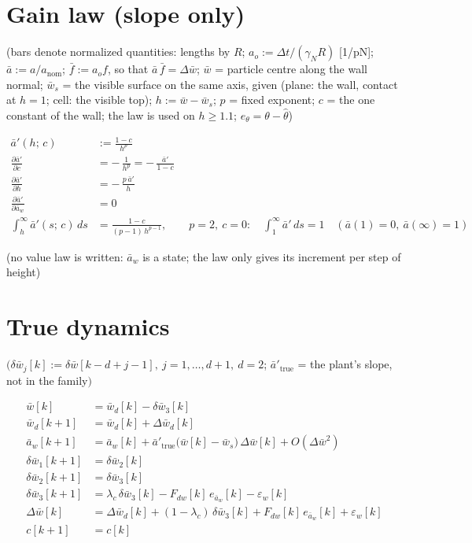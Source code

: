\documentclass[11pt,a4paper,fontset=none]{ctexart}
\newcommand{\ba}{\bar{a}}
\newcommand{\bw}{\bar{w}}
\newcommand{\dW}{\Delta\bw}
\newcommand{\ap}{\ba'}
\begin{document}
\section{Gain law (slope only)}

(bars denote normalized quantities: lengths by $R$; $a_o := \Delta t/(\gamma_N R)$ [1/pN]; $\ba := a/a_{\mathrm{nom}}$;
$\bar f := a_o f$, so that $\ba\,\bar f = \dW$; $\bw$ = particle centre along the wall normal; $\bw_s$ = the visible surface
on the same axis, given (plane: the wall, contact at $h = 1$; cell: the visible top); $h := \bw - \bw_s$;
$p$ = fixed exponent; $c$ = the one constant of the wall; the law is used on $h \ge 1.1$; $e_\theta = \theta - \hat\theta$)

\begin{align*}
\ap(h;\,c)                              &:= \frac{1 - c}{h^{p}} \\[4pt]
\frac{\partial\ap}{\partial c}          &= -\,\frac{1}{h^{p}} = -\,\frac{\ap}{1 - c} \\[4pt]
\frac{\partial\ap}{\partial h}          &= -\,\frac{p\,\ap}{h} \\[4pt]
\frac{\partial\ap}{\partial\ba_w}       &= 0 \\[4pt]
\int_{h}^{\infty}\ap(s;\,c)\,ds         &= \frac{1 - c}{(p-1)\,h^{p-1}}, \qquad
p = 2,\ c = 0:\quad \int_{1}^{\infty}\ap\,ds = 1 \quad(\ba(1) = 0,\ \ba(\infty) = 1)
\end{align*}

(no value law is written: $\ba_w$ is a state; the law only gives its increment per step of height)

\section{True dynamics}

$\bigl(\delta\bw_j[k] := \delta\bw[k-d+j-1],\ j = 1,\dots,d+1,\ d = 2$; $\ap_{\mathrm{true}}$ = the plant's slope, not in the family$\bigr)$

\begin{align*}
\bw[k]           &= \bw_d[k] - \delta\bw_3[k] \\
\bw_d[k+1]       &= \bw_d[k] + \Delta\bw_d[k] \\
\ba_w[k+1]       &= \ba_w[k] + \ap_{\mathrm{true}}\bigl(\bw[k] - \bw_s\bigr)\,\dW[k] + O(\dW^{2}) \\
\delta\bw_1[k+1] &= \delta\bw_2[k] \\
\delta\bw_2[k+1] &= \delta\bw_3[k] \\
\delta\bw_3[k+1] &= \lambda_c\,\delta\bw_3[k] - F_{dw}[k]\,e_{\ba_w}[k] - \varepsilon_w[k] \\
\dW[k]           &= \Delta\bw_d[k] + (1-\lambda_c)\,\delta\bw_3[k] + F_{dw}[k]\,e_{\ba_w}[k] + \varepsilon_w[k] \\
c[k+1]           &= c[k]
\end{align*}
\end{document}
